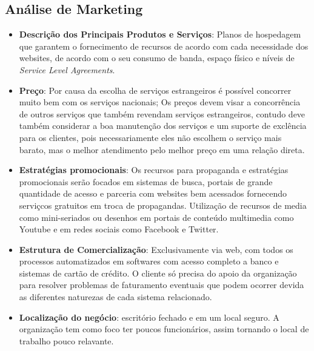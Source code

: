 \documentclass[12pt]{article}
\begin{document}
\subsection{Análise de Marketing}
\begin{itemize}

	\item \textbf{Descrição dos Principais Produtos e Serviços}: Planos de hospedagem que garantem o fornecimento de recursos de acordo com cada necessidade dos websites, de acordo com o seu consumo de banda, espaço físico e níveis de \textit{Service Level Agreements}.
	
	\item \textbf{Preço}: Por causa da escolha de serviços estrangeiros é possível concorrer muito bem com os serviços nacionais; Os preços devem visar a concorrência de outros serviços que também revendam serviços estrangeiros, contudo deve também considerar a boa manutenção dos serviços e um suporte de exclência para os clientes, pois necessariamente eles não escolhem o serviço mais barato, mas o melhor atendimento pelo melhor preço em uma relação direta.
	
	\item \textbf{Estratégias promocionais}: Os recursos para propaganda e estratégias promocionais serão focados em sistemas de busca, portais de grande quantidade de acesso e parceria com websites bem acessados fornecendo serviçcos gratuitos em troca de propagandas. Utilização de recursos de media como mini-seriados ou desenhos em portais de conteúdo multimedia como Youtube e em redes sociais como Facebook e Twitter.

	\item \textbf{Estrutura de Comercialização}: Exclusivamente via web, com todos os processos automatizados em softwares com acesso completo a banco e sistemas de cartão de crédito. O cliente só precisa do apoio da organização para resolver problemas de faturamento eventuais que podem ocorrer devida as diferentes naturezas de cada sistema relacionado.
	
	\item \textbf{Localização do negócio}: escritório fechado e em um local seguro. A organização tem como foco ter poucos funcionários, assim tornando o local de trabalho pouco relavante.

\end{itemize}
\end{document}
